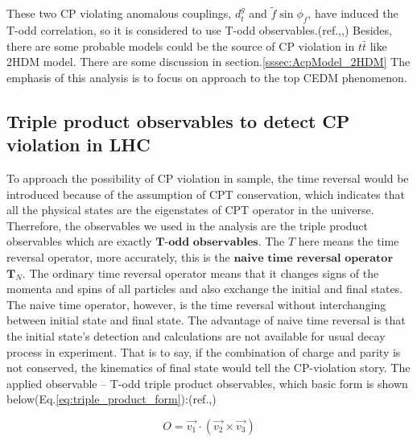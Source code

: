 		These two CP violating anomalous couplings, $d_t^g$ and $\widetilde{f} \sin{\phi_f}$, have induced the T-odd correlation, so it is considered to use T-odd observables.(ref.\cite{PhysRevD.81.034013},\cite{PhysRevD.79.013013},\cite{PhysRevD.80.034013}) Besides, there are some probable models could be the source of CP violation in $t\bar{t}$ like 2HDM model. There are some discussion in section.\ref{sssec:AcpModel_2HDM} The emphasis of this analysis is to focus on approach to the top CEDM phenomenon.


	\subsection{Triple product observables to detect CP violation in LHC}
	\label{ssec:Intro_TPinLHC}


		To approach the possibility of CP violation in sample, the time reversal would be introduced because of the assumption of CPT conservation, which indicates that all the physical states are the eigenstates of CPT operator in the universe. Therrefore, the observables we used in the analysis are the triple product observables which are exactly $\textbf{T-odd}$ $\textbf{observables}$. The $T$ here means the time reversal operator, more accurately, this is the $\textbf{naive}$ $\textbf{time}$ $\textbf{reversal}$ $\textbf{operator}$ $\textbf{T}_N$. The ordinary time reversal operator means that it changes signs of the momenta and spins of all particles and also exchange the initial and final states. The naive time operator, however, is the time reversal without interchanging between initial state and final state. The advantage of naive time reversal is that the initial state's detection and calculations are not available for usual decay process in experiment. That is to say, if the combination of charge and parity is not conserved, the kinematics of final state would tell the CP-violation story. The applied observable -- T-odd triple product observables, which basic form is shown below(Eq.\ref{eq:triple_product_form}):(ref.\cite{PhysRevLett.58.451},\cite{PhysRevD.80.034013})

		\begin{equation}
		O = \vec{v_{1}} \cdot ( \vec{v_2} \times \vec{v_{3}} )
		\label{eq:triple_product_form}
		\end{equation}
		\FloatBarrier

